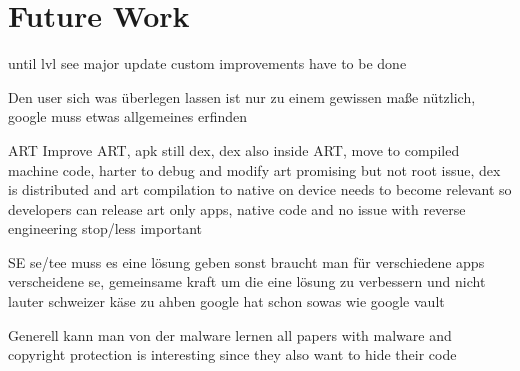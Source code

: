 \section{Future Work}\label{section:conclusion-future}
until lvl see major update custom improvements have to be done

Den user sich was überlegen lassen ist nur zu einem gewissen maße nützlich, google muss etwas allgemeines erfinden

ART
Improve ART, \gls{apk} still dex, dex also inside ART, move to compiled machine code, harter to debug and modify
art promising but not root issue, dex is distributed and art compilation to native on device
needs to become relevant so developers can release art only apps, native code and no issue with reverse engineering stop/less important
\cite{munteanLicense}

SE
se/tee muss es eine lösung geben sonst braucht man für verschiedene apps verscheidene se, gemeinsame kraft um die eine lösung zu verbessern und nicht lauter schweizer käse zu ahben
google hat schon sowas wie google vault

Generell kann man von der malware lernen
all papers with malware and copyright protection is interesting since they also want to hide their code
